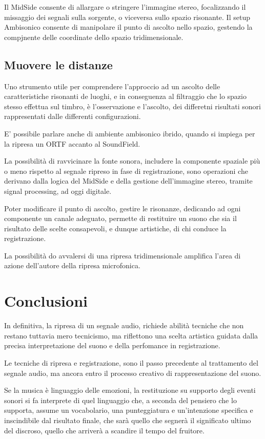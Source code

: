 Il MidSide consente di allargare o stringere l'immagine stereo, focalizzando
il missaggio dei segnali sulla sorgente, o viceversa sullo spazio risonante.
Il setup Ambisonico consente di manipolare il punto di ascolto nello spazio, 
gestendo la compjnente delle coordinate dello spazio tridimensionale.


      
 \subsection*{Muovere le distanze}
 Uno strumento utile per comprendere l'approccio ad un ascolto delle 
 caratteristiche risonanti de luoghi, e in conseguenza al filtraggio che 
 lo spazio stesso effettua sul timbro, è l'osservazione e l'ascolto,
 dei differetni risultati sonori rappresentati dalle differenti configurazioni.
 
 E' possibile parlare anche di ambiente ambisonico ibrido, quando si impiega
 per la ripresa un ORTF accanto al SoundField.
 
 La possibilità di ravvicinare la fonte sonora, includere la componente spaziale
 più o meno rispetto al segnale ripreso in fase di registrazione, sono operazioni
 che derivano dalla logica del MidSide e della gestione dell'immagine stereo,
tramite signal processing, ad oggi digitale.

Poter modificare il punto di ascolto, gestire le risonanze, dedicando ad ogni
componente un canale adeguato, permette di restituire un suono che sia il 
risultato delle scelte consapevoli, e dunque artistiche, di chi conduce la registrazione.

La possibilità do avvalersi di una ripresa tridimensionale amplifica l'area di azione
dell'autore della ripresa microfonica. 



 
\section*{Conclusioni}
  In definitiva, la ripresa di un segnale audio, richiede abilità tecniche che non restano 
  tuttavia mero tecnicismo, ma riflettono una scelta artistica guidata dalla precisa 
  interpretazione del suono e della perfomance in registrazione.
  
  Le tecniche di ripresa e registrazione, sono il passo precedente al trattamento del 
  segnale audio, ma ancora entro il processo creativo di rappresentazione del suono.
  
  Se la musica è linguaggio delle emozioni, la restituzione su supporto degli eventi
  sonori si fa interprete di quel linguaggio che, a seconda del pensiero che lo supporta, 
 assume un vocabolario, una punteggiatura e un'intenzione specifica e inscindibile dal 
 risultato finale, che sarà quello che segnerà il significato ultimo del discroso, quello che 
 arriverà a scandire il tempo del fruitore.
\vfill\null



